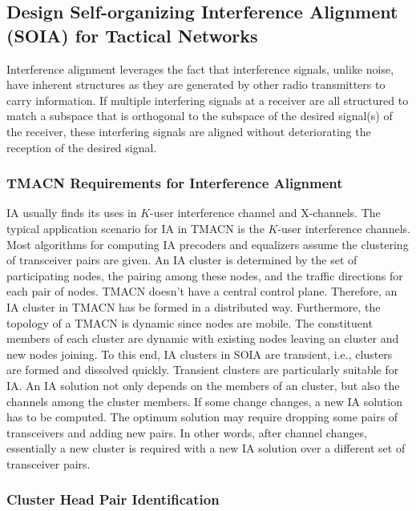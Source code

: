 \documentclass[letterpaper,11pt]{article}
\begin{document}
\subsection{Design Self-organizing Interference Alignment (SOIA) for Tactical Networks}

Interference alignment leverages the fact that interference signals, unlike noise, have inherent structures as they are generated by other radio transmitters to carry information. If multiple interfering signals at a receiver are all structured to match a subspace that is orthogonal to the subspace of the desired signal(s) of the receiver, these interfering signals are aligned without deteriorating the reception of the desired signal. 

\subsubsection{TMACN Requirements for Interference Alignment}

IA usually finds its uses in $K$-user interference channel and X-channels. The typical application scenario for IA in TMACN is the $K$-user interference channels. Most algorithms for computing IA precoders and equalizers assume the clustering of transceiver pairs are given. An IA cluster is determined by the set of participating nodes,  the pairing among these nodes, and the traffic directions for each pair of nodes. TMACN doesn't have a central control plane. Therefore, an IA cluster in TMACN has be formed in a distributed way. Furthermore, the topology of a TMACN is dynamic since nodes are mobile. The constituent members of each cluster are dynamic with existing nodes leaving an cluster and new nodes joining. To this end, IA clusters in SOIA are transient, i.e., clusters are formed and dissolved quickly. Transient clusters are particularly suitable for IA. An IA solution not only depends on the members of an cluster, but also the channels among the cluster members. If some change changes, a new IA solution has to be computed. The optimum solution may require dropping some pairs of transceivers and adding new pairs. In other words, after channel changes, essentially a new cluster is required with a new IA solution over a different set of transceiver pairs. 

\subsubsection{Cluster Head Pair Identification}
\end{document}
